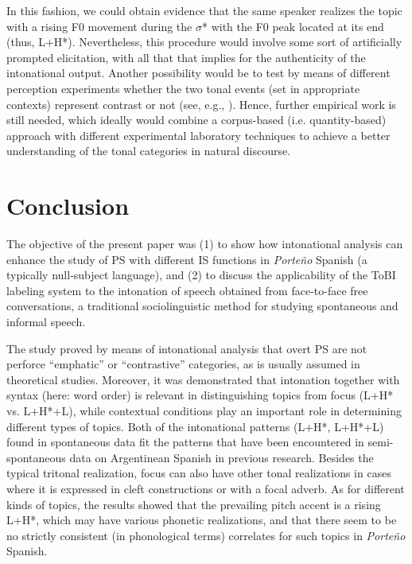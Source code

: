 \documentclass[output=paper]{langsci/langscibook}
\begin{document}
In this fashion, we could obtain evidence that the same speaker realizes the topic with a rising F0 movement during the $\sigma $* with the F0 peak located at its end (thus, L+H*). Nevertheless, this procedure would involve some sort of artificially prompted elicitation, with all that that implies for the authenticity of the intonational output. Another possibility would be to test by means of different perception experiments whether the two tonal events (set in appropriate contexts) represent contrast or not (see, e.g., \citealt{Vanrell2006,Feldhausen2011,BorrasComes.2014}). Hence, further empirical work is still needed, which ideally would combine a corpus-based (i.e. quantity-based) approach with different experimental laboratory techniques to achieve a better understanding of the tonal categories in natural discourse.


\section{Conclusion}
\label{sec:pes:5}
The objective of the present paper was
(1) to show how intonational analysis can enhance the study of PS with different IS functions in \textit{Porte{\~n}o} Spanish (a typically null-subject language), and
(2) to discuss the applicability of the ToBI labeling system to the intonation of speech obtained from face-to-face free conversations, a traditional sociolinguistic method for studying spontaneous and informal speech.

The study proved by means of intonational analysis that overt PS are not perforce ``emphatic'' or ``contrastive'' categories, as is usually assumed in theoretical studies. Moreover, it was demonstrated that intonation together with syntax (here: word order) is relevant in distinguishing topics from focus (L+H* vs. L+H*+L), while contextual conditions play an important role in determining different types of topics. Both of the intonational patterns (L+H*, L+H*+L) found in spontaneous data fit the patterns that have been encountered in semi-spontaneous data on Argentinean Spanish in previous research. Besides the typical tritonal realization, focus can also have other tonal realizations in cases where it is expressed in cleft constructions or with a focal adverb. As for different kinds of topics, the results showed that the prevailing pitch accent is a rising L+H*, which may have various phonetic realizations, and that there seem to be no strictly consistent (in phonological terms) correlates for such topics in \textit{Porte{\~n}o} Spanish.
\end{document}
